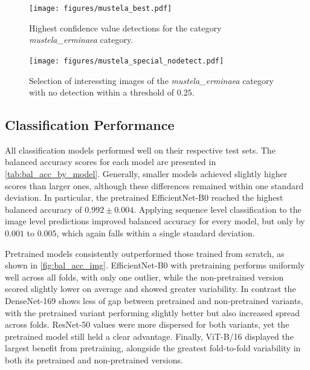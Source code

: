     

    \begin{figure}[]
    \centering
    \texttt{[image: figures/mustela\_best.pdf]}
    \caption{Highest confidence value detections for the category \textit{mustela\_erminaea} category.}
    \label{fig:detection_mustela_best}
    \end{figure}

    \begin{figure}[]
    \centering
    \texttt{[image: figures/mustela\_special\_nodetect.pdf]}
    \caption{Selection of interessting images of the \textit{mustela\_erminaea} category with no detection within a threshold of \(0.25\).}
    \label{fig:detection_special_nodetect}
    \end{figure}


    \subsection{Classification Performance}

    All classification models performed well on their respective test sets.
    The balanced accuracy scores for each model are presented in \autoref{tab:bal_acc_by_model}.
    Generally, smaller models achieved slightly higher scores than larger ones, although these differences remained within one standard deviation.
    In particular, the pretrained EfficientNet-B0 reached the highest balanced accuracy of \(0.992\pm0.004\).
    Applying sequence level classification to the image level predictions improved balanced accuracy for every model, but only by \(0.001\) to \(0.005\), which again falls within a single standard deviation.

    Pretrained models consistently outperformed those trained from scratch, as shown in \autoref{fig:bal_acc_img}.
    EfficientNet-B0 with pretraining performs uniformly well across all folds, with only one outlier, while the non-pretrained version scored slightly lower on average and showed greater variability.
    In contrast the DenseNet-169 shows less of gap between pretrained and non-pretrained variants, with the pretrained variant performing slightly better but also increased spread across folds.
    ResNet-50 values were more dispersed for both variants, yet the pretrained model still held a clear advantage. 
    Finally, ViT-B/16 displayed the largest benefit from pretraining, alongside the greatest fold-to-fold variability in both its pretrained and non-pretrained versions.

